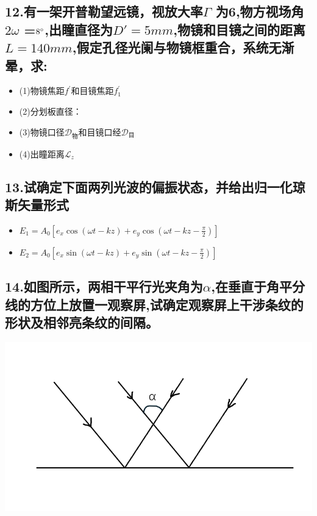 \documentclass[11pt,a4paper]{article}
\begin{document}
    \subsection*{12.有一架开普勒望远镜，视放大率$\varGamma$ 为6,物方视场角$2\omega$ =$8\degree$,出瞳直径为$D'=5mm$,物镜和目镜之间的距离$L=140mm$,假定孔径光阑与物镜框重合，系统无渐晕，求:}
    \begin{itemize}
        \vspace{0mm}
        \item (1)物镜焦距\( f^{\prime} \)和目镜焦距\( f_{1}^{\prime} \)
        \vspace{0mm}
        \item (2)分划板直径：
        \vspace{0mm}
        \item (3)物镜口径\(\mathcal{D}_{\text{物}}\)和目镜口经\(\mathcal{D}_{\text{目}}\) 
        \vspace{0mm}
        \item (4)出瞳距离\(\mathcal{L}_{z}\)
    \end{itemize}
    \vspace{20mm}
    \subsection*{13.试确定下面两列光波的偏振状态，并给出归一化琼斯矢量形式}
    \begin{itemize}
        \vspace{0mm}
        \item \(E_{1}=A_{0}\left[e_{x}\cos (\omega t-kz)+e_{y}\cos (\omega t-kz-\frac{\pi}{2})\right] \)
        \item \(E_{2}=A_{0}\left[e_{x}\sin (\omega t-kz)+e_{y}\sin (\omega t-kz-\frac{\pi}{2})\right] \)
    \end{itemize}
    \vspace{20mm}
    \subsection*{14.如图所示，两相干平行光夹角为$\alpha $,在垂直于角平分线的方位上放置一观察屏,试确定观察屏上干涉条纹的形状及相邻亮条纹的间隔。}
    \includegraphics[scale=0.3]{6.png}
    \vspace{20mm}
\end{document}
